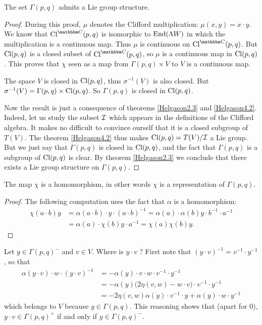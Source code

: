 \begin{proposition}
The set $\Gamma(p,q)$ admits a Lie group structure.
\end{proposition}
\begin{proof}

During this proof, $\mu$ denotes the Clifford multiplication: $\mu(x,y)=x\cdot y$. We know that $\Cliff^{\eC}(p,q)$ is isomorphic to $\operatorname{End}(\Lambda W)$ in which the multiplication is a continuous map. Thus $\mu$ is continuous on $\Cliff^{\eC}(p,q)$. But $\operatorname{Cl}(p,q)$ is a closed subset of $\Cliff^{\eC}(p,q)$, so $\mu$ is a continuous map in $\operatorname{Cl}(p,q)$. This proves that  $\chi$ seen as a map from $\Gamma(p,q)\times V$ to $V$ is a continuous map.

The space $V$ is closed in $\operatorname{Cl}(p,q)$, thus $\sigma^{-1}(V)$ is also closed. But $\sigma^{-1}(V)=\Gamma(p,q)\times\operatorname{Cl}(p,q)$. So $\Gamma(p,q)$ is closed in $\operatorname{Cl}(p,q)$.

Now the result is just a consequence of theorems \ref{Helgason2.3} and \ref{Helgason4.2}. Indeed, let us study the subset $\mathcal{I}$ which appears in the definitions of the Clifford algebra. It makes no difficult to convince ourself that it is a closed subgroup of $T(V)$. The theorem \ref{Helgason4.2} thus makes $\operatorname{Cl}(p,q)=T(V)/\mathcal{I}$ a Lie group. But we just say that $\Gamma(p,q)$ is closed in $\operatorname{Cl}(p,q)$, and the fact that $\Gamma(p,q)$ is a subgroup of $\operatorname{Cl}(p,q)$ is clear. By theorem \ref{Helgason2.3} we conclude that there exists a Lie group structure on $\Gamma(p,q)$.
\end{proof}

\begin{lemma}
The map $\chi$ is a homomorphism, in other words $\chi$ is a representation of $\Gamma(p,q)$.
\end{lemma}

\begin{proof}
The following computation uses the fact that $\alpha$ is a homomorphism:
\[
\begin{split}
\chi(a\cdot b)y&=\alpha(a\cdot b)\cdot y\cdot (a\cdot b)^{-1}
               =\alpha(a)\cdot\alpha(b)y\cdot b^{-1}\cdot a^{-1}\\
               &=\alpha(a)\cdot\chi(b)y\cdot a^{-1}
               =\chi(a)\chi(b)y.
\end{split}
\]
\end{proof}
Let $y\in\Gamma(p,q)^-$ and $v\in V$. Where is $y\cdot v$ ? First note that $(y\cdot v)^{-1}=v^{-1}\cdot y^{-1}$, so that
\begin{equation}
\begin{split}
  \alpha(y\cdot v)\cdot w\cdot(y\cdot v)^{-1}&=-\alpha(y)\cdot v\cdot w\cdot v^{-1}\cdot y^{-1}\\
                                            &=-\alpha(y)\big( 2\eta(v,w)-w\cdot v \big)\cdot v^{-1}\cdot y^{-1}\\
					    &=-2\eta(v,w)\alpha(y)\cdot v^{-1}\cdot y+\alpha(y)\cdot w\cdot y^{-1}
\end{split}
\end{equation}
which belongs to $V$ because $y\in\Gamma(p,q)$. This reasoning shows that (apart for $0$), $y\cdot v\in\Gamma(p,q)^+$ if and only if $y\in\Gamma(p,q)^-$.

